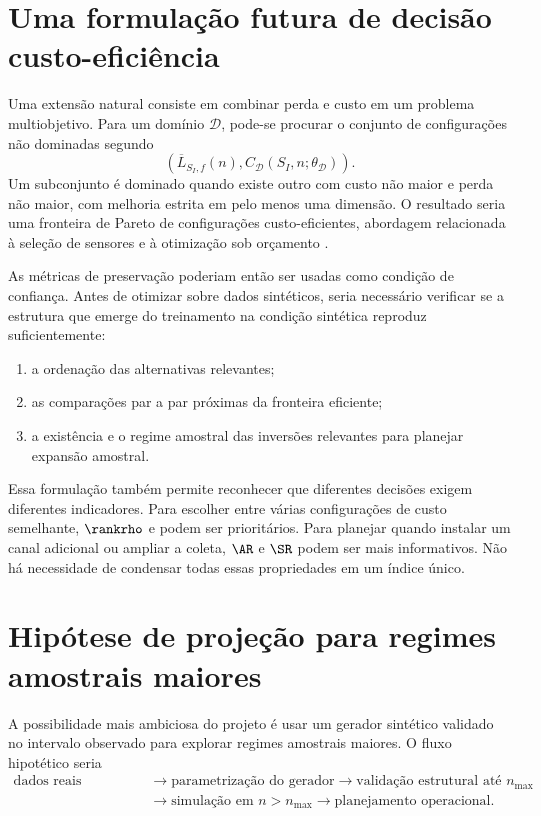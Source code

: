 \section{Uma formulação futura de decisão custo-eficiência}

Uma extensão natural consiste em combinar perda e custo em um problema multiobjetivo. Para um domínio $\mathcal{D}$, pode-se procurar o conjunto de configurações não dominadas segundo
\[
\left(
  \overline{L}_{S_I,f}(n),
  C_{\mathcal{D}}(S_I,n;\theta_{\mathcal{D}})
\right).
\]
Um subconjunto é dominado quando existe outro com custo não maior e perda não maior, com melhoria estrita em pelo menos uma dimensão. O resultado seria uma fronteira de Pareto de configurações custo-eficientes, abordagem relacionada à seleção de sensores e à otimização sob orçamento \cite{joshi2009,krause2008}.

As métricas de preservação poderiam então ser usadas como condição de confiança. Antes de otimizar sobre dados sintéticos, seria necessário verificar se a estrutura que emerge do treinamento na condição sintética reproduz suficientemente:

\begin{enumerate}
  \item a ordenação das alternativas relevantes;
  \item as comparações par a par próximas da fronteira eficiente;
  \item a existência e o regime amostral das inversões relevantes para planejar expansão amostral.
\end{enumerate}

Essa formulação também permite reconhecer que diferentes decisões exigem diferentes indicadores. Para escolher entre várias configurações de custo semelhante, $\rankrho$ e \WinnersAgreement{} podem ser prioritários. Para planejar quando instalar um canal adicional ou ampliar a coleta, $\AR$ e $\SR$ podem ser mais informativos. Não há necessidade de condensar todas essas propriedades em um índice único.

\section{Hipótese de projeção para regimes amostrais maiores}

A possibilidade mais ambiciosa do projeto é usar um gerador sintético validado no intervalo observado para explorar regimes amostrais maiores. O fluxo hipotético seria
\[
\begin{aligned}
\text{dados reais disponíveis}
&\longrightarrow \text{parametrização do gerador}
\longrightarrow \text{validação estrutural até }n_{\max}\\
&\longrightarrow \text{simulação em }n>n_{\max}
\longrightarrow \text{planejamento operacional}.
\end{aligned}
\]

